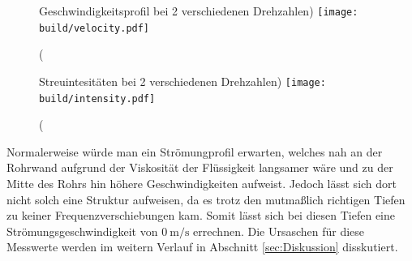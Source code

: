 \begin{figure}
    \centering
    \caption(Geschwindigkeitsprofil bei 2 verschiedenen Drehzahlen)
    \label{fig:velocity}
    \texttt{[image: build/velocity.pdf]}
\end{figure}
\begin{figure}
    \centering
    \caption(Streuintesitäten bei 2 verschiedenen Drehzahlen)
    \label{fig:intensity}
    \texttt{[image: build/intensity.pdf]}
\end{figure}
Normalerweise würde man ein Strömungprofil erwarten, welches nah an der Rohrwand aufgrund der Viskosität der Flüssigkeit langsamer wäre und zu der Mitte des 
Rohrs hin höhere Geschwindigkeiten aufweist.
Jedoch lässt sich dort nicht solch eine Struktur aufweisen, da es trotz den mutmaßlich richtigen Tiefen zu keiner Frequenzverschiebungen kam.
Somit lässt sich bei diesen Tiefen eine Strömungsgeschwindigkeit von $\SI{0}{\metre\per\second}$ errechnen.
Die Ursaschen für diese Messwerte werden im weitern Verlauf in Abschnitt \ref{sec:Diskussion} disskutiert.